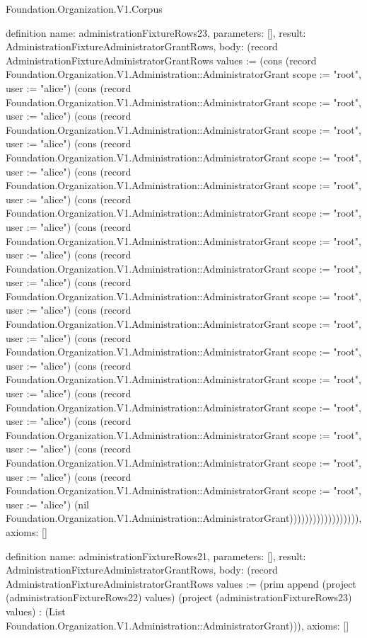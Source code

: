 \begin{lexlean}{Foundation.Organization.V1.Corpus}
\begin{semanticmodule}
definition{
  name: administrationFixtureRows23,
  parameters: [],
  result: AdministrationFixtureAdministratorGrantRows,
  body: (record AdministrationFixtureAdministratorGrantRows {values := (cons (record Foundation.Organization.V1.Administration::AdministratorGrant {scope := "root", user := "alice"}) (cons (record Foundation.Organization.V1.Administration::AdministratorGrant {scope := "root", user := "alice"}) (cons (record Foundation.Organization.V1.Administration::AdministratorGrant {scope := "root", user := "alice"}) (cons (record Foundation.Organization.V1.Administration::AdministratorGrant {scope := "root", user := "alice"}) (cons (record Foundation.Organization.V1.Administration::AdministratorGrant {scope := "root", user := "alice"}) (cons (record Foundation.Organization.V1.Administration::AdministratorGrant {scope := "root", user := "alice"}) (cons (record Foundation.Organization.V1.Administration::AdministratorGrant {scope := "root", user := "alice"}) (cons (record Foundation.Organization.V1.Administration::AdministratorGrant {scope := "root", user := "alice"}) (cons (record Foundation.Organization.V1.Administration::AdministratorGrant {scope := "root", user := "alice"}) (cons (record Foundation.Organization.V1.Administration::AdministratorGrant {scope := "root", user := "alice"}) (cons (record Foundation.Organization.V1.Administration::AdministratorGrant {scope := "root", user := "alice"}) (cons (record Foundation.Organization.V1.Administration::AdministratorGrant {scope := "root", user := "alice"}) (cons (record Foundation.Organization.V1.Administration::AdministratorGrant {scope := "root", user := "alice"}) (cons (record Foundation.Organization.V1.Administration::AdministratorGrant {scope := "root", user := "alice"}) (cons (record Foundation.Organization.V1.Administration::AdministratorGrant {scope := "root", user := "alice"}) (cons (record Foundation.Organization.V1.Administration::AdministratorGrant {scope := "root", user := "alice"}) (nil Foundation.Organization.V1.Administration::AdministratorGrant)))))))))))))))))}),
  axioms: []
}

definition{
  name: administrationFixtureRows21,
  parameters: [],
  result: AdministrationFixtureAdministratorGrantRows,
  body: (record AdministrationFixtureAdministratorGrantRows {values := (prim append (project (administrationFixtureRows22) values) (project (administrationFixtureRows23) values) : (List Foundation.Organization.V1.Administration::AdministratorGrant))}),
  axioms: []
}


\end{semanticmodule}
\end{lexlean}

